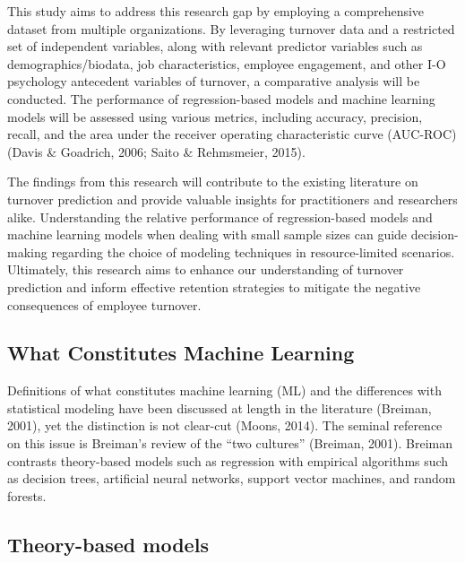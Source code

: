 \documentclass[
  man]{apa6}
\begin{document}
This study aims to address this research gap by employing a comprehensive dataset from multiple organizations. By leveraging turnover data and a restricted set of independent variables, along with relevant predictor variables such as demographics/biodata, job characteristics, employee engagement, and other I-O psychology antecedent variables of turnover, a comparative analysis will be conducted. The performance of regression-based models and machine learning models will be assessed using various metrics, including accuracy, precision, recall, and the area under the receiver operating characteristic curve (AUC-ROC) (Davis \& Goadrich, 2006; Saito \& Rehmsmeier, 2015).

The findings from this research will contribute to the existing literature on turnover prediction and provide valuable insights for practitioners and researchers alike. Understanding the relative performance of regression-based models and machine learning models when dealing with small sample sizes can guide decision-making regarding the choice of modeling techniques in resource-limited scenarios. Ultimately, this research aims to enhance our understanding of turnover prediction and inform effective retention strategies to mitigate the negative consequences of employee turnover.

\hypertarget{what-constitutes-machine-learning}{%
\subsection{What Constitutes Machine Learning}\label{what-constitutes-machine-learning}}

Definitions of what constitutes machine learning (ML) and the differences with statistical modeling have been discussed at length in the literature (Breiman, 2001), yet the distinction is not clear-cut (Moons, 2014). The seminal reference on this issue is Breiman's review of the ``two cultures'' (Breiman, 2001). Breiman contrasts theory-based models such as regression with empirical algorithms such as decision trees, artificial neural networks, support vector machines, and random forests.

\hypertarget{theory-based-models}{%
\subsection{Theory-based models}\label{theory-based-models}}
\end{document}
